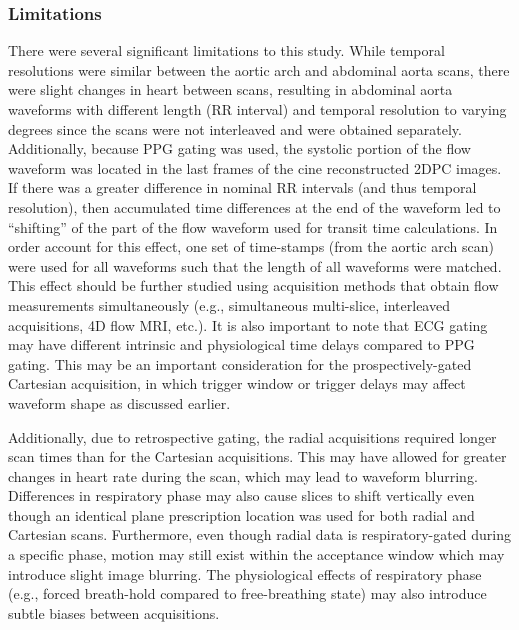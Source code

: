 \subsubsection{Limitations}
There were several significant limitations to this study. While temporal resolutions were similar between the aortic arch and abdominal aorta scans, there were slight changes in heart between scans, resulting in abdominal aorta waveforms with different length (RR interval) and temporal resolution to varying degrees since the scans were not interleaved and were obtained separately. Additionally, because PPG gating was used, the systolic portion of the flow waveform was located in the last frames of the cine reconstructed 2DPC images. If there was a greater difference in nominal RR intervals (and thus temporal resolution), then accumulated time differences at the end of the waveform led to “shifting” of the part of the flow waveform used for transit time calculations. In order account for this effect, one set of time-stamps (from the aortic arch scan) were used for all waveforms such that the length of all waveforms were matched. This effect should be further studied using acquisition methods that obtain flow measurements simultaneously (e.g., simultaneous multi-slice, interleaved acquisitions, 4D flow MRI, etc.). It is also important to note that ECG gating may have different intrinsic and physiological time delays compared to PPG gating. This may be an important consideration for the prospectively-gated Cartesian acquisition, in which trigger window or trigger delays may affect waveform shape as discussed earlier. 

Additionally, due to retrospective gating, the radial acquisitions required longer scan times than for the Cartesian acquisitions. This may have allowed for greater changes in heart rate during the scan, which may lead to waveform blurring. Differences in respiratory phase may also cause slices to shift vertically even though an identical plane prescription location was used for both radial and Cartesian scans. Furthermore, even though radial data is respiratory-gated during a specific phase, motion may still exist within the acceptance window which may introduce slight image blurring. The physiological effects of respiratory phase (e.g., forced breath-hold compared to free-breathing state) may also introduce subtle biases between acquisitions. 

